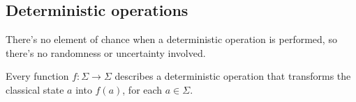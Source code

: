\documentclass{report}
\begin{document}
\subsection{Deterministic operations}
There's no element of chance when a deterministic operation is performed, so there's no randomness or uncertainty involved.

\bigbreak

Every function $f:\Sigma\rightarrow\Sigma$ describes a deterministic operation that transforms the classical state $a$ into $f(a)$, for each $a\in\Sigma$.

\end{document}
